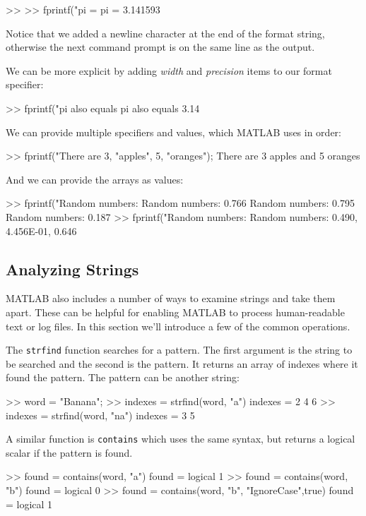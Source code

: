 \begin{code}
>> %
>> fprintf("pi = %
pi = 3.141593
\end{code}
Notice that we added a newline character at the end of the format string, otherwise the next command prompt is on the same line as the output.

We can be more explicit by adding \emph{width} and \emph{precision} items to our format specifier:
\begin{code}
>> fprintf("pi also equals %
    pi also equals 3.14
\end{code}

We can provide multiple specifiers and values, which MATLAB uses in order:
\begin{code}
>> fprintf("There are %
3, "apples", 5, "oranges");
    There are 3 apples and 5 oranges
\end{code}

And we can provide the arrays as values:
\begin{code}
>> fprintf("Random numbers: %
Random numbers: 0.766
Random numbers: 0.795
Random numbers: 0.187
>> fprintf("Random numbers: %
Random numbers: 0.490, 4.456E-01, 0.646 
\end{code}




\subsection{Analyzing Strings}

MATLAB also includes a number of ways to examine strings and take them apart.  These can be helpful for enabling MATLAB to process human-readable text or log files.  In this section we'll introduce a few of the common operations.

The \lstinline{strfind} function searches for a pattern.  The first argument is the string to be searched and the second is the pattern.  It returns an array of indexes where it found the pattern. The pattern can be another string:
\begin{code}
>> word = "Banana";
>> indexes = strfind(word, "a")
    indexes =
         2     4     6
>> indexes = strfind(word, "na")
    indexes =
          3     5
\end{code}
A similar function is \lstinline{contains} which uses the same syntax, but returns a logical scalar if the pattern is found.
\begin{code}
>> found = contains(word, "a")
found =
  logical
   1
>> found = contains(word, "b")
found =
  logical
   0
>> found = contains(word, "b", "IgnoreCase",true)
found =
  logical
   1
\end{code}

